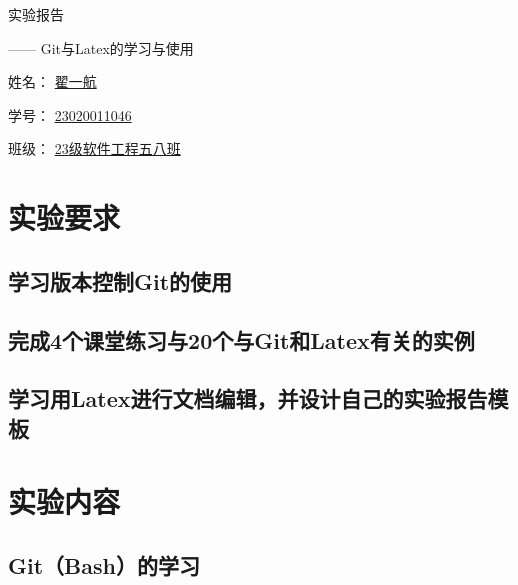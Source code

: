 \documentclass[UTF8,a4paper]{ctexart}
\begin{document}
\begin{sloppypar}
	
	\begin{center}
		\begin{fontsize}{80pt}{20pt}
			实验报告
		\end{fontsize}

		\bigskip
		\bigskip
		
		\begin{fontsize}{35pt}{20pt}
			\begin{flushright}
				—— {\Huge Git}与{\Huge Latex}的学习与使用
			\end{flushright}
		\end{fontsize}
		
		\bigskip
		\bigskip
		\bigskip
		\bigskip
		\bigskip
		\bigskip
		\bigskip
		\bigskip
		\bigskip
		\bigskip
		\bigskip
		\bigskip
		\bigskip
		\bigskip
		\bigskip
		\bigskip
		
		\begin{fontsize}{25pt}{20pt}
			姓名：
			\underline{翟一航}
			
			\bigskip
			\bigskip
			\bigskip
			\bigskip
			
			学号：
			\underline{{\huge 23020011046}}
			
			\bigskip
			\bigskip
			\bigskip
			\bigskip
			
			班级：
			\underline{{\Huge 23}级软件工程五八班}
			
			
		\end{fontsize}
	\end{center}
	\section{实验要求}
	\subsection{学习版本控制Git的使用}
	\subsection{完成4个课堂练习与20个与Git和Latex有关的实例}
	\subsection{学习用Latex进行文档编辑，并设计自己的实验报告模板}
	\section{实验内容}
	\subsection{Git（Bash）的学习}

\end{sloppypar}
\end{document}
